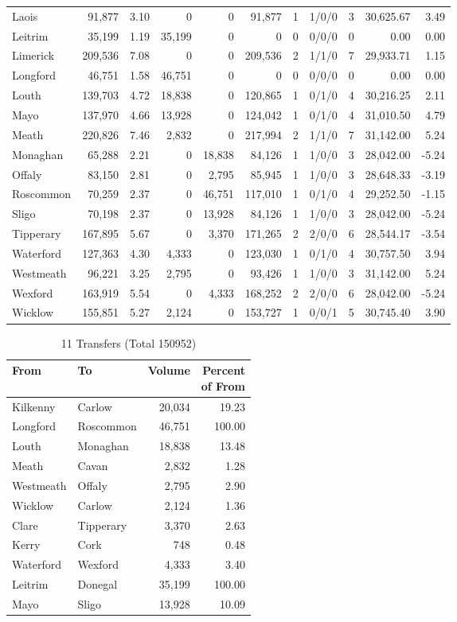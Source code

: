 \documentclass[a4paper]{article}
\begin{document}
\begin{longtable}{lrrrrrrlrrr}
Laois&91,877& 3.10&0&0&91,877&1&1/0/0&3&30,625.67& 3.49\\ 
Leitrim&35,199& 1.19&35,199&0&0&0&0/0/0&0& 0.00& 0.00\\ 
Limerick&209,536& 7.08&0&0&209,536&2&1/1/0&7&29,933.71& 1.15\\ 
Longford&46,751& 1.58&46,751&0&0&0&0/0/0&0& 0.00& 0.00\\ 
Louth&139,703& 4.72&18,838&0&120,865&1&0/1/0&4&30,216.25& 2.11\\ 
Mayo&137,970& 4.66&13,928&0&124,042&1&0/1/0&4&31,010.50& 4.79\\ 
Meath&220,826& 7.46&2,832&0&217,994&2&1/1/0&7&31,142.00& 5.24\\ 
Monaghan&65,288& 2.21&0&18,838&84,126&1&1/0/0&3&28,042.00&-5.24\\ 
Offaly&83,150& 2.81&0&2,795&85,945&1&1/0/0&3&28,648.33&-3.19\\ 
Roscommon&70,259& 2.37&0&46,751&117,010&1&0/1/0&4&29,252.50&-1.15\\ 
Sligo&70,198& 2.37&0&13,928&84,126&1&1/0/0&3&28,042.00&-5.24\\ 
Tipperary&167,895& 5.67&0&3,370&171,265&2&2/0/0&6&28,544.17&-3.54\\ 
Waterford&127,363& 4.30&4,333&0&123,030&1&0/1/0&4&30,757.50& 3.94\\ 
Westmeath&96,221& 3.25&2,795&0&93,426&1&1/0/0&3&31,142.00& 5.24\\ 
Wexford&163,919& 5.54&0&4,333&168,252&2&2/0/0&6&28,042.00&-5.24\\ 
Wicklow&155,851& 5.27&2,124&0&153,727&1&0/0/1&5&30,745.40& 3.90\\ 
\end{longtable}

\begin{table}[htbp]
\caption{11 Transfers (Total 150952)}
\centering
\begin{tabular}{llrr} \toprule
From &To &Volume &\shortstack{Percent\\of From} \\ \midrule
Kilkenny&Carlow&20,034&19.23\\ 
Longford&Roscommon&46,751&100.00\\ 
Louth&Monaghan&18,838&13.48\\ 
Meath&Cavan&2,832& 1.28\\ 
Westmeath&Offaly&2,795& 2.90\\ 
Wicklow&Carlow&2,124& 1.36\\ 
Clare&Tipperary&3,370& 2.63\\ 
Kerry&Cork&748& 0.48\\ 
Waterford&Wexford&4,333& 3.40\\ 
Leitrim&Donegal&35,199&100.00\\ 
Mayo&Sligo&13,928&10.09\\ 
\bottomrule
\end{tabular}
\end{table}
\end{document}
